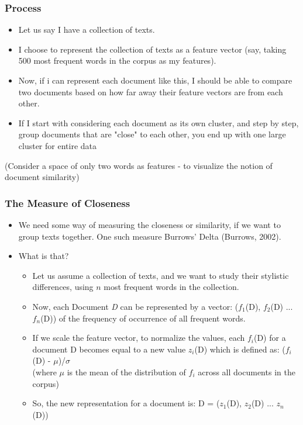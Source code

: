 \documentclass{beamer}
\begin{document}
\begin{frame}
\frametitle{Process}
\begin{itemize}
\item Let us say I have a collection of texts.
\item I choose to represent the collection of texts as a feature vector (say, taking 500 most frequent words in the corpus as my features).
\item Now, if i can represent each document like this, I should be able to compare two documents based on how far away their feature vectors are from each other.
\item If I start with considering each document as its own cluster, and step by step, group documents that are "close" to each other, you end up with one large cluster for entire data 
\end{itemize}
(Consider a space of only two words as features - to visualize the notion of document similarity)
\end{frame}

\begin{frame}
\frametitle{The Measure of Closeness}
\begin{itemize}
\item We need some way of measuring the closeness or similarity, if we want to group texts together. One such measure Burrows' Delta (Burrows, 2002). 
\item What is that?
\begin{itemize}
\item Let us assume a collection of texts, and we want to study their stylistic differences, using $n$ most frequent words in the collection.
\item Now, each Document \textit{D} can be represented by a vector: ($f_1$(D), $f_2$(D) ... $f_n$(D)) of the frequency of occurrence of all frequent words.
\item If we scale the feature vector, to normalize the values, each $f_i$(D) for a document D becomes equal to a new value $z_i$(D)  which is defined as: ($f_i$(D) - $\mu$)/$\sigma$
\\ (where $\mu$ is the mean of the distribution of $f_i$ across all documents in the corpus)
\item So, the new representation for a document is: D = ($z_1$(D), $z_2$(D) ... $z_n$(D))
\end{itemize}
\end{itemize}
\end{frame}
\end{document}
